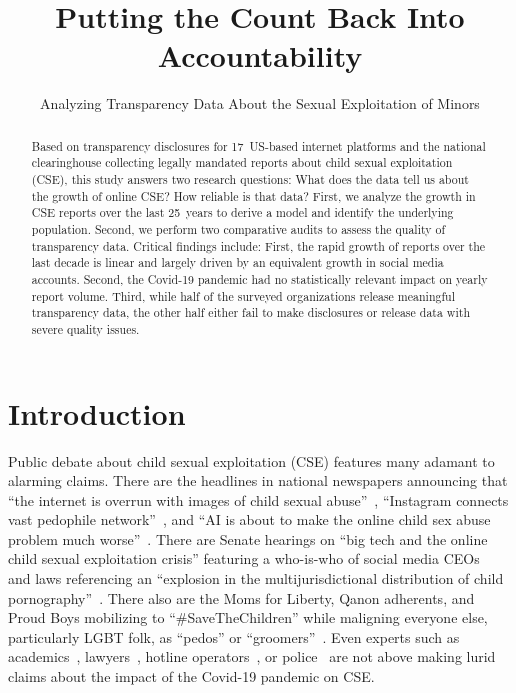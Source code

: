\documentclass[anonymous,nonacm,screen,12pt]{acmart}
\newcommand\V[1]{{#1}}
\newcommand\V[1]{\textsc{\MakeLowercase{#1}}}
\theoremstyle{definition}
\begin{document}
\title{Putting the Count Back Into Accountability}
\subtitle{Analyzing Transparency Data About the Sexual Exploitation of Minors}
\credits

\begin{abstract}

Based on transparency disclosures for 17~US-based internet platforms and the
national clearinghouse collecting legally mandated reports about child sexual
exploitation (\V{CSE}), this study answers two research questions: What does the
data tell us about the growth of online \V{CSE}? How reliable is that data?
First, we analyze the growth in \V{CSE} reports over the last 25~years to derive
a model and identify the underlying population. Second, we perform two
comparative audits to assess the quality of transparency data. Critical findings
include: First, the rapid growth of reports over the last decade is linear and
largely driven by an equivalent growth in social media accounts. Second, the
Covid-19 pandemic had no statistically relevant impact on yearly report volume.
Third, while half of the surveyed organizations release meaningful transparency
data, the other half either fail to make disclosures or release data with severe
quality issues.

\end{abstract}


\maketitle



\section{Introduction}
\label{sec:introduction}

Public debate about child sexual exploitation (\V{CSE}) features many adamant to
alarming claims. There are the headlines in national newspapers announcing that
``the internet is overrun with images of child sexual
abuse''~\cite{KellerDance2019}, ``Instagram connects vast pedophile
network''~\cite{HorwitzBlunt2023}, and ``\V{AI} is about to make the online
child sex abuse problem much worse''~\cite{Oremus2024}. There are Senate
hearings on ``big tech and the online child sexual exploitation crisis''
featuring a who-is-who of social media \V{CEO}s~\cite{Durbin2024} and laws
referencing an ``explosion in the multijurisdictional distribution of child
pornography''~\cite{UnitedStatesCongress2008}. There also are the Moms for
Liberty, Qanon adherents, and Proud Boys mobilizing to ``\#SaveTheChildren''
while maligning everyone else, particularly \V{LGBT} folk, as ``pedos'' or
``groomers''~\cite{BuntainBarlowea2022, MartinyLawrence2023}. Even experts such
as academics~\cite{SalterWoodlockea2023}, lawyers~\cite{Haney2021b}, hotline
operators~\cite{ODonnell2021}, or police~\cite{Europol2020, Interpol2020} are
not above making lurid claims about the impact of the Covid-19 pandemic on
\V{CSE}.
\end{document}
